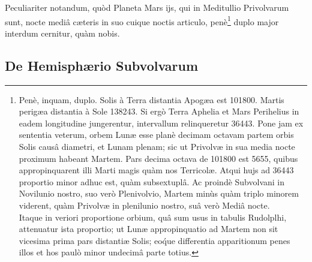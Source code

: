 \documentclass[a4paper, 11pt, oneside, polutonikogreek, german]{article}
\begin{document}
Peculiariter notandum, quòd Planeta Mars ijs, qui in Meditullio Privolvarum sunt, nocte mediâ cæteris in suo cuique noctis articulo, penè\footnote{Penè, inquam, duplo. Solis à Terra distantia Apogæa est 101800. Martis perigæa distantia à Sole 138243. Si ergò Terra Aphelia et Mars Perihelius in eadem longitudine jungerentur, intervallum relinqueretur 36443. Pone jam ex sententia veterum, orbem Lunæ esse planè decimam octavam partem orbis Solis causâ diametri, et Lunam plenam; sic ut Privolvæ in sua media nocte proximum habeant Martem. Pars decima octava de 101800 est 5655, quibus appropinquarent illi Marti magis quàm nos Terricolæ. Atqui hujs ad 36443 proportio minor adhuc est, quàm subsextuplâ. Ac proindè Subvolvani in Novilunio nostro, suo verò Plenivolvio, Martem minùs quàm triplo minorem viderent, quàm Privolvæ in plenilunio nostro, suâ verò Mediâ nocte.\\\hspace*{5mm}Itaque in veriori proportione orbium, quâ sum usus in tabulis Rudolplhi, attenuatur ista proportio; ut Lunæ appropinquatio ad Martem non sit vicesima prima pars distantiæ Solis; eo\'que differentia apparitionum penes illos et hos paulò minor undecimâ parte totius.} duplo major interdum cernitur, quàm nobis.

\subsection{De Hemisphærio Subvolvarum}
\end{document}
